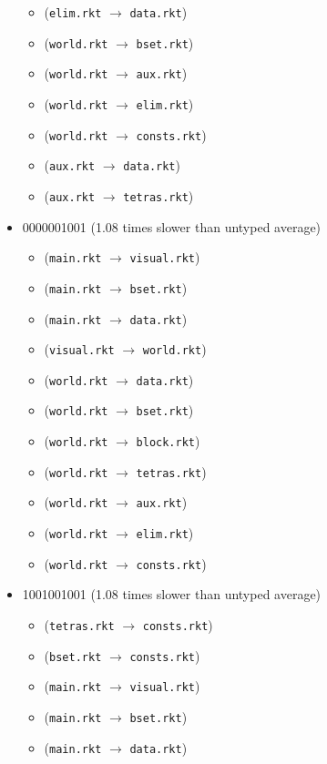 \documentclass{article}
\newcommand{\mono}[1]{\texttt{#1}}
\begin{document}
\begin{itemize}
\begin{itemize}
  \item (\mono{elim.rkt} $\rightarrow$ \mono{data.rkt})
  \item (\mono{world.rkt} $\rightarrow$ \mono{bset.rkt})
  \item (\mono{world.rkt} $\rightarrow$ \mono{aux.rkt})
  \item (\mono{world.rkt} $\rightarrow$ \mono{elim.rkt})
  \item (\mono{world.rkt} $\rightarrow$ \mono{consts.rkt})
  \item (\mono{aux.rkt} $\rightarrow$ \mono{data.rkt})
  \item (\mono{aux.rkt} $\rightarrow$ \mono{tetras.rkt})
  \end{itemize}
\item 0000001001 (1.08 times slower than untyped average)
  \begin{itemize}
  \item (\mono{main.rkt} $\rightarrow$ \mono{visual.rkt})
  \item (\mono{main.rkt} $\rightarrow$ \mono{bset.rkt})
  \item (\mono{main.rkt} $\rightarrow$ \mono{data.rkt})
  \item (\mono{visual.rkt} $\rightarrow$ \mono{world.rkt})
  \item (\mono{world.rkt} $\rightarrow$ \mono{data.rkt})
  \item (\mono{world.rkt} $\rightarrow$ \mono{bset.rkt})
  \item (\mono{world.rkt} $\rightarrow$ \mono{block.rkt})
  \item (\mono{world.rkt} $\rightarrow$ \mono{tetras.rkt})
  \item (\mono{world.rkt} $\rightarrow$ \mono{aux.rkt})
  \item (\mono{world.rkt} $\rightarrow$ \mono{elim.rkt})
  \item (\mono{world.rkt} $\rightarrow$ \mono{consts.rkt})
  \end{itemize}
\item 1001001001 (1.08 times slower than untyped average)
  \begin{itemize}
  \item (\mono{tetras.rkt} $\rightarrow$ \mono{consts.rkt})
  \item (\mono{bset.rkt} $\rightarrow$ \mono{consts.rkt})
  \item (\mono{main.rkt} $\rightarrow$ \mono{visual.rkt})
  \item (\mono{main.rkt} $\rightarrow$ \mono{bset.rkt})
  \item (\mono{main.rkt} $\rightarrow$ \mono{data.rkt})

\end{itemize}
\end{itemize}
\end{document}
